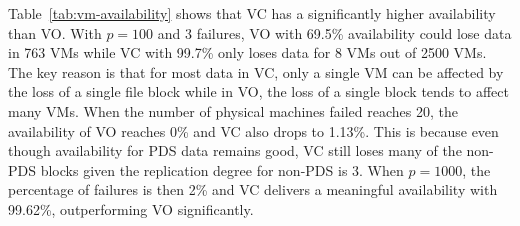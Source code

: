 

 Table~\ref{tab:vm-availability} shows 
that VC has a significantly  higher availability than VO.
With $p=100$ and 3 failures,
VO with 69.5\% availability could lose data in 763 VMs 
while VC with 99.7\% only loses data for 8 VMs out of 2500 VMs.
The key reason is that for most data in VC, only a single VM can be affected by
the loss of a single file block
while in VO, the loss of a
single block tends to affect many VMs.
When the number of physical machines failed reaches 20, the availability of VO reaches 0\%
and VC also drops to 1.13\%. This is because even though availability for PDS data remains good, VC still
loses many of the non-PDS blocks given the replication degree for non-PDS is 3.
When $p=1000$, the percentage of failures is then 2\% and VC delivers a meaningful availability 
with 99.62\%, outperforming VO significantly. 

